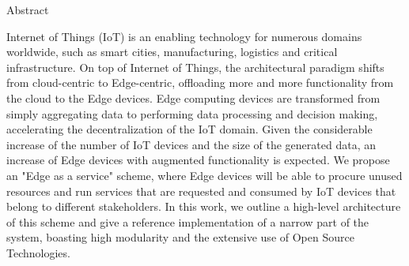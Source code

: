 \pagestyle{plain}
\begin{center}
{\LARGE Abstract}\\[1cm]
\end{center}

Internet of Things (IoT) is an enabling technology for numerous domains worldwide, such as smart cities, manufacturing, logistics and critical infrastructure. On top of Internet of Things, the architectural paradigm shifts from  cloud-centric to Edge-centric, offloading more and more functionality from the cloud to the Edge devices. Edge computing devices are transformed from simply aggregating data to performing data processing and decision making, accelerating the decentralization of the IoT domain. Given the considerable increase of the number of IoT devices and the size of the generated data, an increase of Edge devices with augmented functionality is expected. We propose an "Edge as a service" scheme, where Edge devices will be able to procure unused resources and run services that are requested and consumed by IoT devices that belong to different stakeholders. In this work, we outline a high-level architecture of this scheme and give a reference implementation of a narrow part of the system, boasting high modularity and the extensive use of Open Source Technologies.
 